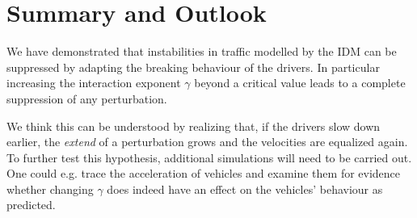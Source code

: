 \section{Summary and Outlook}

We have demonstrated that instabilities in traffic modelled by the IDM can be suppressed by adapting the breaking behaviour of the drivers. In particular increasing the interaction exponent $\gamma$ beyond a critical value leads to a complete suppression of any perturbation.

We think this can be understood by realizing that, if the drivers slow down earlier, the \emph{extend} of a perturbation grows and the velocities are equalized again. To further test this hypothesis, additional simulations will need to be carried out. One could e.g. trace the acceleration of vehicles and examine them for evidence whether changing $\gamma$ does indeed have an effect on the vehicles' behaviour as predicted.